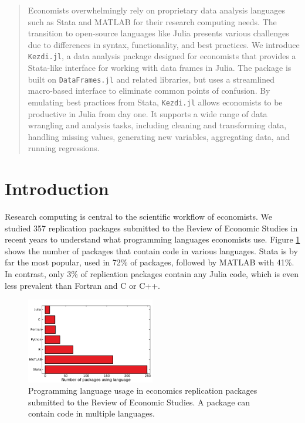 \documentclass{juliacon}
\begin{document}

\maketitle

\begin{abstract}
Economists overwhelmingly rely on proprietary data analysis languages such as Stata and MATLAB for their research computing needs. The transition to open-source languages like Julia presents various challenges due to differences in syntax, functionality, and best practices. We introduce \texttt{Kezdi.jl}, a data analysis package designed for economists that provides a Stata-like interface for working with data frames in Julia. The package is built on \texttt{DataFrames.jl} and related libraries, but uses a streamlined macro-based interface to eliminate common points of confusion. By emulating best practices from Stata, \texttt{Kezdi.jl} allows economists to be productive in Julia from day one. It supports a wide range of data wrangling and analysis tasks, including cleaning and transforming data, handling missing values, generating new variables, aggregating data, and running regressions.
\end{abstract}

\section{Introduction}

Research computing is central to the scientific workflow of economists. We studied 357 replication packages submitted to the Review of Economic Studies in recent years to understand what programming languages economists use.
Figure \ref{fig:languages} shows the number of packages that contain code in various languages. Stata is by far the most popular, used in 72\% of packages, followed by MATLAB with 41\%. In contrast, only 3\% of replication packages contain any Julia code, which is even less prevalent than Fortran and C or C++.

\begin{figure}[h]
\centering
\includegraphics[width=0.5\textwidth]{languages.png}
\caption{Programming language usage in economics replication packages submitted to the Review of Economic Studies. A package can contain code in multiple languages.}
\label{fig:languages}
\end{figure}
\end{document}
